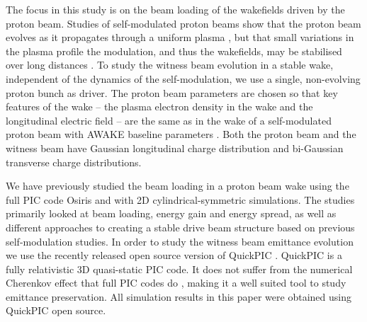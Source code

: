\documentclass[aps,prstab,reprint,amsmath,amssymb,groupedaddress]{revtex4-1}
\begin{document}
The focus in this study is on the beam loading of the wakefields driven by the proton beam. Studies of self-modulated
proton beams show that the proton beam evolves as it propagates through a uniform plasma \cite{lotov:2011}, but that
small variations in the plasma profile the modulation, and thus the wakefields, may be stabilised over long distances
\cite{lotov:2011, lotov:2015, caldwell:2011}. To study the witness beam evolution in a stable wake, independent of the
dynamics of the self-modulation, we use a single, non-evolving proton bunch as driver. The proton beam parameters
are chosen so that key features of the wake -- the plasma electron density in the wake and the longitudinal electric
field -- are the same as in the wake of a self-modulated proton beam with AWAKE baseline parameters
\cite{gschwendtner:2016}. Both the proton beam and the witness beam have Gaussian longitudinal charge distribution and
bi-Gaussian transverse charge distributions.

We have previously studied the beam loading in a proton beam wake using the full PIC code Osiris \cite{fonseca:2002}
and with 2D cylindrical-symmetric simulations. The studies \cite{berglyd_olsen:2015, berglyd_olsen:2016} primarily
looked at beam loading, energy gain and energy spread, as well as different approaches to creating a stable drive beam
structure based on previous self-modulation studies. In order to study the witness beam emittance evolution we use the
recently released open source version of QuickPIC \cite{huang:2006, an:2013}. QuickPIC is a fully relativistic 3D
quasi-static PIC code. It does not suffer from the numerical Cherenkov effect that full PIC codes do
\cite{godfrey:1974,lehe:2013}, making it a well suited tool to study emittance preservation. All simulation results in
this paper were obtained using QuickPIC open source.

\end{document}
